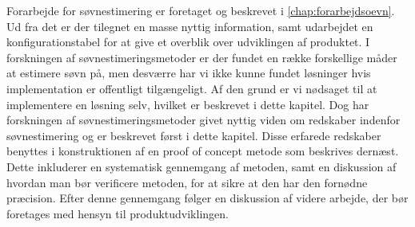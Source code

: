 Forarbejde for søvnestimering er foretaget og beskrevet i \cref{chap:forarbejdsoevn}.
Ud fra det er der tilegnet en masse nyttig information, samt udarbejdet en konfigurationstabel for at give et overblik over udviklingen af produktet.
I forskningen af søvnestimeringsmetoder er der fundet en række forskellige måder at estimere søvn på, men desværre har vi ikke kunne fundet løsninger hvis implementation er offentligt tilgængeligt.
Af den grund er vi nødsaget til at implementere en løsning selv, hvilket er beskrevet i dette kapitel.
Dog har forskningen af søvnestimeringsmetoder givet nyttig viden om redskaber indenfor søvnestimering og er beskrevet først i dette kapitel.
Disse erfarede redskaber benyttes i konstruktionen af en proof of concept metode som beskrives dernæst.
Dette inkluderer en systematisk gennemgang af metoden, samt en diskussion af hvordan man bør verificere metoden, for at sikre at den har den fornødne præcision.
Efter denne gennemgang følger en diskussion af videre arbejde, der bør foretages med hensyn til produktudviklingen.






